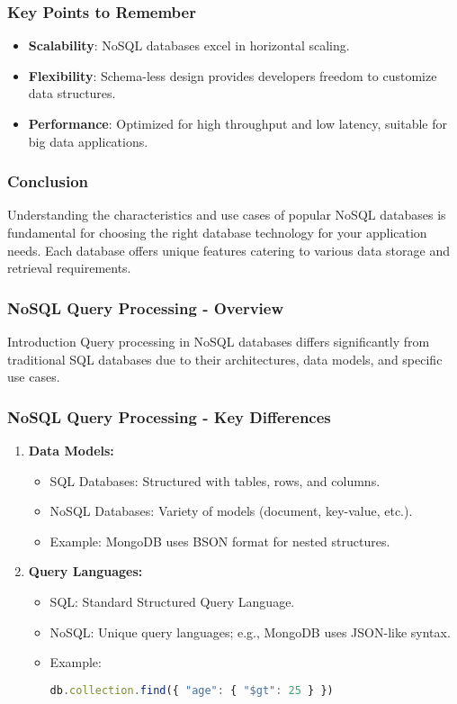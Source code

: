 \documentclass[aspectratio=169]{beamer}
\begin{document}
\begin{frame}
    \frametitle{Key Points to Remember}
    \begin{itemize}
        \item \textbf{Scalability}: NoSQL databases excel in horizontal scaling.
        \item \textbf{Flexibility}: Schema-less design provides developers freedom to customize data structures.
        \item \textbf{Performance}: Optimized for high throughput and low latency, suitable for big data applications.
    \end{itemize}
\end{frame}

\begin{frame}
    \frametitle{Conclusion}
    Understanding the characteristics and use cases of popular NoSQL databases is fundamental for choosing the right database technology for your application needs. Each database offers unique features catering to various data storage and retrieval requirements.
\end{frame}

\begin{frame}[fragile]
    \frametitle{NoSQL Query Processing - Overview}
    \begin{block}{Introduction}
        Query processing in NoSQL databases differs significantly from traditional SQL databases due to their architectures, data models, and specific use cases.
    \end{block}
\end{frame}

\begin{frame}[fragile]
    \frametitle{NoSQL Query Processing - Key Differences}
    \begin{enumerate}
        \item \textbf{Data Models:}
            \begin{itemize}
                \item SQL Databases: Structured with tables, rows, and columns.
                \item NoSQL Databases: Variety of models (document, key-value, etc.).
                \item Example: MongoDB uses BSON format for nested structures.
            \end{itemize}
        
        \item \textbf{Query Languages:}
            \begin{itemize}
                \item SQL: Standard Structured Query Language.
                \item NoSQL: Unique query languages; e.g., MongoDB uses JSON-like syntax.
                \item Example: \begin{lstlisting}[language=Javascript]
db.collection.find({ "age": { "$gt": 25 } })
                \end{lstlisting}
            \end{itemize}
    \end{enumerate}
\end{frame}
\end{document}
